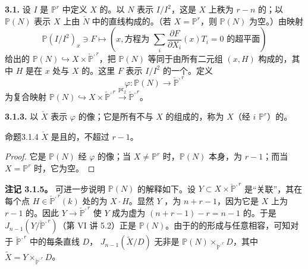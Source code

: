 \textbf{3.1.} 设 $I$ 是 $\mathbb P^r$ 中定义 $X$ 的。以 $N$ 表示 $I/I^2$，这是 $X$ 上秩为 $r-n$ 的；以 $\mathbb P(N)$ 表示 $X$ 上由 $\check N$ 中的直线构成的。（若 $X=\mathbb P^r$，则 $\mathbb P(N)$ 为空。）由映射
\[
\mathbb P(I/I^2)_x\ni F\longmapsto
\left(x,\text{方程为 }\sum_i\frac{\partial F}{\partial X_i}(x)T_i=0\text{ 的超平面}\right)
\tag{3.1.1}
\]
给出的 $\mathbb P(N)\hookrightarrow X\times\check{\mathbb P}^{,r}$，把 $\mathbb P(N)$ 等同于由所有二元组 $(x,H)$ 构成的，其中 $H$ 是在 $x$ 处与 $X$ 的。这里 $F$ 表示 $I/I^2$ 的一个。定义
\[
\varphi:\mathbb P(N)\longrightarrow\check{\mathbb P}^{,r}\tag{3.1.2}
\]
为复合映射 $\mathbb P(N)\hookrightarrow X\times\check{\mathbb P}^{,r}\xrightarrow{\operatorname{pr}_2}\check{\mathbb P}^{,r}$。

\textbf{3.1.3.} 以 $\check X$ 表示 $\varphi$ 的像；它是所有不与 $X$ 的组成的，称为 $X$（经 $i$  $\mathbb P^r$）的。

\begin{SGAresult}{命题}{3.1.4}
 $\check X$ 是且的，不超过 $r-1$。
\end{SGAresult}
\begin{proof}
它是 $\mathbb P(N)$ 经 $\varphi$ 的像；当 $X\ne\mathbb P^r$ 时，$\mathbb P(N)$ 本身，为 $r-1$；而当 $X=\mathbb P^r$ 时，它为空。
\end{proof}

\textbf{注记 3.1.5。} 可进一步说明 $\mathbb P(N)$ 的解释如下。设 $Y\subset X\times\check{\mathbb P}^{,r}$ 是“关联”，其在每个点 $H\in\check{\mathbb P}^{,r}(k)$ 处的为 $X\cdot H$。显然 $Y$ ，为 $n+r-1$，因为它是 $X$ 上为 $r-1$ 的。因此 $Y\to\check{\mathbb P}^{,r}$ 使 $Y$ 成为虚为 $(n+r-1)-r=n-1$ 的。于是  $J_{n-1}(Y/\check{\mathbb P}^{,r})$（第 VI 讲 5.2）正是 $\mathbb P(N)$。由于的的形成与任意相容，可知对于 $\check{\mathbb P}^{,r}$ 中的每条直线 $D$， $J_{n-1}(\widetilde X/D)$ 无非是 $\mathbb P(N)\times_{\check{\mathbb P}^{,r}}D$，其中 $\widetilde X=Y\times_{\check{\mathbb P}^{,r}}D$。

